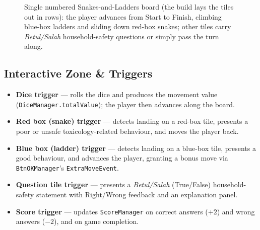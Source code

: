 \documentclass[a4paper,12pt]{article}
\begin{document}
\begin{figure}[H]
\centering
{}
\caption{Single numbered Snakes-and-Ladders board (the build lays the tiles out in rows): the player advances from Start to Finish, climbing blue-box ladders and sliding down red-box snakes; other tiles carry \emph{Betul/Salah} household-safety questions or simply pass the turn along.}
\label{fig:levelplan}
\end{figure}

\subsection{Interactive Zone \& Triggers}

\begin{itemize}
  \item \textbf{Dice trigger} --- rolls the dice and produces the movement value (\texttt{DiceManager.totalValue}); the player then advances along the board.
  \item \textbf{Red box (snake) trigger} --- detects landing on a red-box tile, presents a poor or unsafe toxicology-related behaviour, and moves the player back.
  \item \textbf{Blue box (ladder) trigger} --- detects landing on a blue-box tile, presents a good behaviour, and advances the player, granting a bonus move via \texttt{BtnOKManager}'s \texttt{ExtraMoveEvent}.
  \item \textbf{Question tile trigger} --- presents a \emph{Betul/Salah} (True/False) household-safety statement with Right/Wrong feedback and an explanation panel.
  \item \textbf{Score trigger} --- updates \texttt{ScoreManager} on correct answers ($+2$) and wrong answers ($-2$), and on game completion.
\end{itemize}
\end{document}
